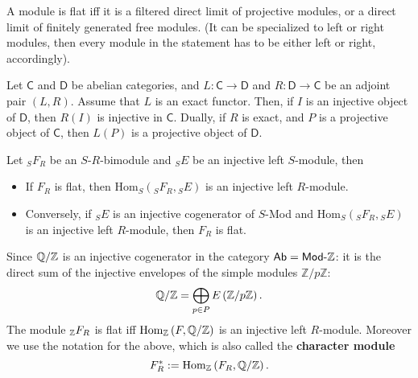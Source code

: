 \begin{thm}[Lazard]
	A module is flat iff
	it is a filtered direct limit of projective modules,
	or a direct limit of finitely generated free modules.
	(It can be specialized to left or right modules, then every module in the
	statement has to be either left or right, accordingly).
\end{thm}

\begin{lem}
	Let $\mathsf{C}$ and $\mathsf{D}$ be abelian categories, and $L: \mathsf{C} \to \mathsf{D}$ and
	$R: \mathsf{D} \to \mathsf{C}$ be an adjoint pair $\left(L, R\right)$.
	Assume that $L$ is an exact functor.
	Then, if $I$ is an injective object of $\mathsf{D}$,
	then $R(I)$ is injective in $\mathsf{C}$.
	Dually, if $R$ is exact, and $P$ is a projective object of $\mathsf{C}$, then
	$L(P)$ is a projective object of $\mathsf{D}$.
\end{lem} 

\begin{prop}
	Let ${}_SF_R$ be an $S$-$R$-bimodule and ${}_SE$ be an injective left $S$-module, then
	\begin{itemize}
		\item If $F_R$ is flat, then $\mathrm{Hom}_{S}\left( {}_SF_R, {}_SE \right)$ is 
			an injective left $R$-module.
		\item Conversely, if ${}_SE$ is an injective cogenerator of $S$-Mod
			and $\mathrm{Hom}_{S}\left( {}_SF_R, {}_SE \right)$
			is an injective left $R$-module, then $F_R$ is flat.
	\end{itemize}
\end{prop} 

\begin{cor}
	Since $\mathbb{Q}/\mathbb{Z}$ is an injective cogenerator in the category $\mathsf{Ab} = \mathsf{Mod}\text{-}\mathbb{Z}$:
	it is the direct sum of the injective envelopes of the simple modules $\mathbb{Z}/p\mathbb{Z}$:
	\begin{equation}
		\mathbb{Q}/\mathbb{Z} = \bigoplus_{p \in P} E \left( \mathbb{Z}/p\mathbb{Z} \right)
	.\end{equation} 
	The module ${}_{\mathbb{Z}}F_R$ is flat iff
	$\mathrm{Hom}_{\mathbb{Z}}\left( F, \mathbb{Q}/\mathbb{Z} \right)$ is an injective left
	$R$-module.
	Moreover we use the notation for the above, which is also called the \textbf{character module}
	\begin{equation}
	F_R^*:= \mathrm{Hom}_{\mathbb{Z}}\left( F_R, \mathbb{Q}/\mathbb{Z} \right)
	.\end{equation} 
\end{cor} 

